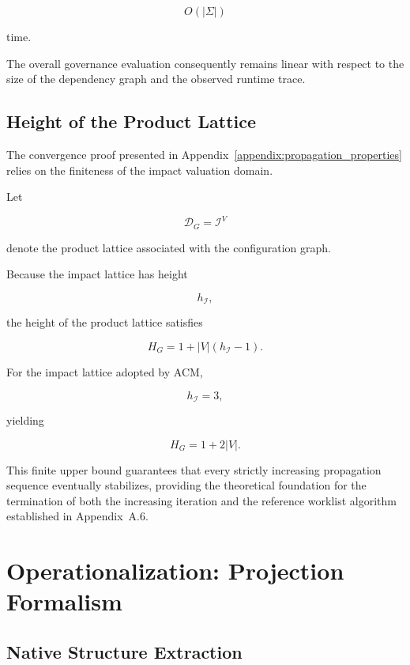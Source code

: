 \documentclass[10pt]{article}
\begin{document}
	\[
	O(|\Sigma|)
	\]
	
	time.
	
	The overall governance evaluation consequently remains linear with respect to
	the size of the dependency graph and the observed runtime trace.
	
	\subsection{Height of the Product Lattice}
	\label{appendix:lattice_height}
	
	The convergence proof presented in Appendix~\ref{appendix:propagation_properties}
	relies on the finiteness of the impact valuation domain.
	
	Let
	
	\[
	\mathcal D_G
	=
	\mathcal I^{V}
	\]
	
	denote the product lattice associated with the configuration graph.
	
	Because the impact lattice has height
	
	\[
	h_{\mathcal I},
	\]
	
	the height of the product lattice satisfies
	
	\begin{equation}
		\label{eq:product_lattice_height}
		H_G
		=
		1
		+
		|V|
		\left(
		h_{\mathcal I}-1
		\right).
	\end{equation}
	
	For the impact lattice adopted by ACM,
	
	\[
	h_{\mathcal I}=3,
	\]
	
	yielding
	
	\[
	H_G
	=
	1+2|V|.
	\]
	
	This finite upper bound guarantees that every strictly increasing propagation
	sequence eventually stabilizes, providing the theoretical foundation for the
	termination of both the increasing iteration and the reference worklist
	algorithm established in Appendix~A.6.
\section{Operationalization: Projection Formalism}
\label{appendix:projection_formalism}
\subsection{Native Structure Extraction}
\end{document}
